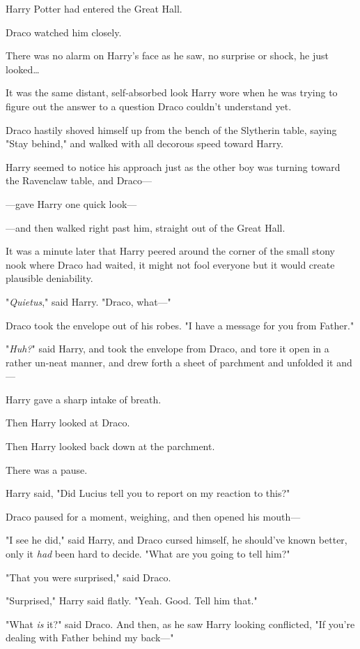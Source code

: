 Harry Potter had entered the Great Hall.

Draco watched him closely.

There was no alarm on Harry's face as he saw, no surprise or shock, he just 
looked{\ldots}

It was the same distant, self-absorbed look Harry wore when he was trying to 
figure out the answer to a question Draco couldn't understand yet.

Draco hastily shoved himself up from the bench of the Slytherin table, saying 
"Stay behind," and walked with all decorous speed toward Harry.

Harry seemed to notice his approach just as the other boy was turning toward 
the Ravenclaw table, and Draco---

---gave Harry one quick look---

---and then walked right past him, straight out of the Great Hall.

It was a minute later that Harry peered around the corner of the small stony 
nook where Draco had waited, it might not fool everyone but it would create 
plausible deniability.

"\emph{Quietus}," said Harry. "Draco, what---"

Draco took the envelope out of his robes. "I have a message for you from 
Father."

"\emph{Huh?}" said Harry, and took the envelope from Draco, and tore it open in 
a rather un-neat manner, and drew forth a sheet of parchment and unfolded it 
and---

Harry gave a sharp intake of breath.

Then Harry looked at Draco.

Then Harry looked back down at the parchment.

There was a pause.

Harry said, "Did Lucius tell you to report on my reaction to this?"

Draco paused for a moment, weighing, and then opened his mouth---

"I see he did," said Harry, and Draco cursed himself, he should've known 
better, only it \emph{had} been hard to decide. "What are you going to tell 
him?"

"That you were surprised," said Draco.

"Surprised," Harry said flatly. "Yeah. Good. Tell him that."

"What \emph{is} it?" said Draco. And then, as he saw Harry looking conflicted, 
"If you're dealing with Father behind my back---"

